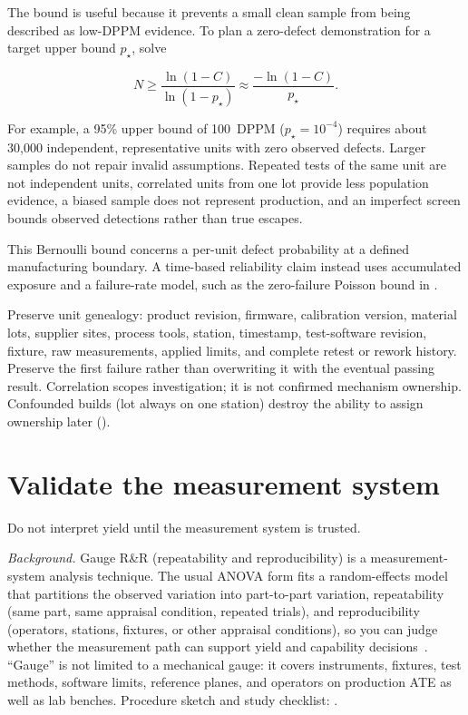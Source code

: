 The bound is useful because it prevents a small clean sample from being
described as low-DPPM evidence. To plan a zero-defect demonstration for a target
upper bound $p_\star$, solve

\begin{equation}
N
\ge
\frac{\ln(1-C)}{\ln(1-p_\star)}
\approx
\frac{-\ln(1-C)}{p_\star}.
\label{eq:mfg-zero-defect-sample-size}
\end{equation}

For example, a 95\% upper bound of 100~DPPM
($p_\star=10^{-4}$) requires about 30{,}000 independent, representative units
with zero observed defects. Larger samples do not repair invalid assumptions.
Repeated tests of the same unit are not independent units, correlated units
from one lot provide less population evidence, a biased sample does not
represent production, and an imperfect screen bounds observed detections rather
than true escapes.

This Bernoulli bound concerns a per-unit defect probability at a defined
manufacturing boundary. A time-based reliability claim instead uses accumulated
exposure and a failure-rate model, such as the zero-failure Poisson bound in
.

Preserve unit genealogy: product revision, firmware, calibration version,
material lots, supplier sites, process tools, station, timestamp, test-software
revision, fixture, raw measurements, applied limits, and complete retest or
rework history. Preserve the first failure rather than overwriting it with the
eventual passing result. Correlation scopes investigation; it is not confirmed
mechanism ownership. Confounded builds (lot always on one station) destroy the
ability to assign ownership later
().

\section{Validate the measurement system}
\label{sec:gauge-rr}

Do not interpret yield until the measurement system is trusted.

\textit{Background.} Gauge R\&R (repeatability and
reproducibility) is a measurement-system analysis technique. The usual
ANOVA form fits a random-effects model that partitions the
observed variation into
part-to-part variation, repeatability (same part, same appraisal condition,
repeated trials), and reproducibility (operators, stations, fixtures, or other
appraisal conditions), so you can judge whether the measurement path can support
yield and capability decisions~\cite{aiagmsa}. ``Gauge'' is not limited to a
mechanical gauge: it covers instruments, fixtures, test methods, software
limits, reference planes, and operators on production ATE as well as lab
benches. Procedure sketch and study checklist:
.

